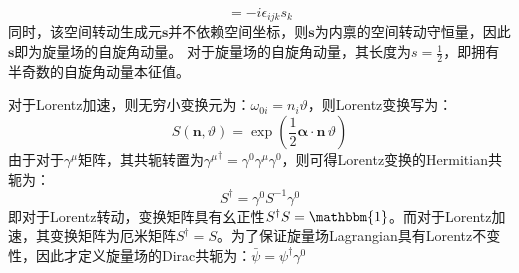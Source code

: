 \begin{equation}
[s_i,s_j]=-i\epsilon_{ijk}s_k
\end{equation}
同时，该空间转动生成元$\boldsymbol{s}$并不依赖空间坐标，则$\boldsymbol{s}$为内禀的空间转动守恒量，因此$\boldsymbol{s}$即为旋量场的自旋角动量。
对于旋量场的自旋角动量，其长度为$s=\frac{1}{2}$，即拥有半奇数的自旋角动量本征值。
\par 对于Lorentz加速，则无穷小变换元为：$\omega_{0i}=n_i \vartheta$，则Lorentz变换写为：
\begin{equation}
S(\boldsymbol{n},\vartheta)=\exp\left(\frac{1}{2}\boldsymbol{\alpha}\cdot\boldsymbol{n}\,\vartheta\right)
\end{equation}
由于对于$\gamma^\mu$矩阵，其共轭转置为${\gamma^\mu}^\dagger=\gamma^0\gamma^\mu\gamma^0$，则可得Lorentz变换的Hermitian共轭为：
\begin{equation}
S^\dagger=\gamma^0 S^{-1}\gamma^0
\end{equation}
即对于Lorentz转动，变换矩阵具有幺正性$S^\dagger S=\mathbbm{1}$。而对于Lorentz加速，其变换矩阵为厄米矩阵$S^\dagger=S$。为了保证旋量场Lagrangian具有Lorentz不变性，因此才定义旋量场的Dirac共轭为：$\bar{\psi}=\psi^\dagger\gamma^0$
